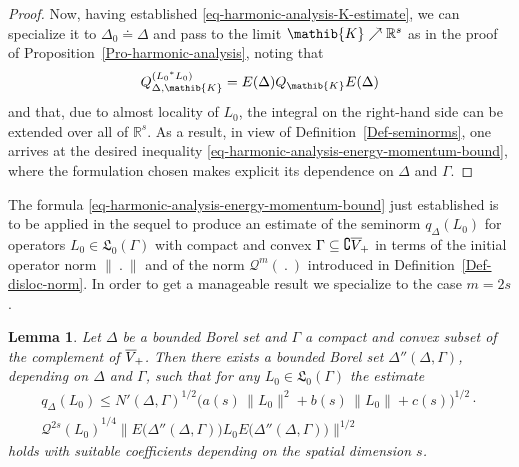 \documentclass[11pt,twoside,openright]{report}
\theoremstyle{definition}
\theoremstyle{plain}
\newtheorem{Lem}[Def]{Lemma}
\theoremstyle{remark}
\theoremstyle{assumption}
\newcommand{\norm}[1]{\lVert #1 \rVert}
\newcommand{\bnorm}[1]{\bigl\lVert #1 \bigr\rVert}
\newcommand{\Qmx}[1]{\mathcal{Q}^m ( #1 )}
\newcommand{\Qtwosx}[1]{\mathcal{Q}^{2 s} ( #1 )}
\newcommand{\qDx}[1]{q_\Delta ( #1 )}
\newcommand{\Lfrak}{\mathfrak{L}}
\newcommand{\Kib}{\mathib{K}}
\newcommand{\Rs}{\mathbb{R}^s}
\newcommand{\fwcone}{\overline{V}_{\negthinspace +}}
\newcommand{\ED}{E ( \Delta )}
\newcommand{\EDdG}{E \bigl( \Delta'' ( \Delta , \Gamma ) \bigr)}
\begin{document}
\begin{proof}
  Now, having established \eqref{eq-harmonic-analysis-K-estimate}, we
  can specialize it to $\Delta_0 \doteq \Delta$ and pass to the limit
  $\Kib \nearrow \Rs$ as in the proof of
  Proposition~\ref{Pro-harmonic-analysis}, noting that
  \begin{equation*}
    Q_{\Delta , \Kib}^{( {L_0}^* L_0 )} = \ED Q_\Kib \ED
  \end{equation*}
  and that, due to almost locality of $L_0$, the integral on the
  right-hand side can be extended over all of $\Rs$. As a result, in
  view of Definition~\ref{Def-seminorms}, one arrives at the desired
  inequality \eqref{eq-harmonic-analysis-energy-momentum-bound}, where
  the formulation chosen makes explicit its dependence on $\Delta$ and
  $\Gamma$.
\end{proof}

The formula \eqref{eq-harmonic-analysis-energy-momentum-bound} just
established is to be applied in the sequel to produce an estimate of
the seminorm $\qDx{L_0}$ for operators $L_0 \in \Lfrak_0 ( \Gamma )$
with compact and convex $\Gamma \subseteq \complement \fwcone$ in
terms of the initial operator norm $\norm{~.~}$ and of the norm
$\Qmx{~.~}$ introduced in Definition~\ref{Def-disloc-norm}. In order
to get a manageable result we specialize to the case $m = 2s$.
\begin{Lem}
  \label{Lem-qD-energy-bound}
  Let $\Delta$ be a bounded Borel set and $\Gamma$ a compact and
  convex subset of the complement of $\fwcone$. Then there exists a
  bounded Borel set $\Delta'' ( \Delta , \Gamma )$, depending on
  $\Delta$ and $\Gamma$, such that for any $L_0 \in \Lfrak_0 ( \Gamma
  )$ the estimate
  \begin{multline}
    \label{eq-qD-energy-bound}
    \qDx{L_0} \leqslant N' ( \Delta , \Gamma )^{1 / 2} \bigl( a ( s )
    \, \norm{L_0}^2 + b ( s ) \, \norm{L_0} + c ( s ) \bigr)^{1 / 2}
    \cdot \\
    {\Qtwosx{L_0}}^{1 / 4} \bnorm{\EDdG L_0 \EDdG}^{1 / 2}
  \end{multline}
  holds with suitable coefficients depending on the spatial dimension
  $s$.
\end{Lem}
\end{document}
